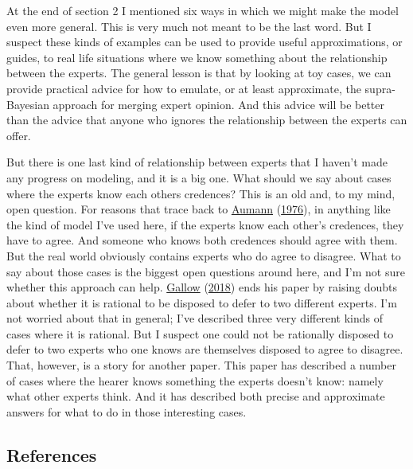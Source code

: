 \documentclass[
  12pt,
]{article}
\begin{document}
At the end of section 2 I mentioned six ways in which we might make the
model even more general. This is very much not meant to be the last
word. But I suspect these kinds of examples can be used to provide
useful approximations, or guides, to real life situations where we know
something about the relationship between the experts. The general lesson
is that by looking at toy cases, we can provide practical advice for how
to emulate, or at least approximate, the supra-Bayesian approach for
merging expert opinion. And this advice will be better than the advice
that anyone who ignores the relationship between the experts can offer.

But there is one last kind of relationship between experts that I
haven't made any progress on modeling, and it is a big one. What should
we say about cases where the experts know each others credences? This is
an old and, to my mind, open question. For reasons that trace back to
\protect\hyperlink{ref-Aumann1976}{Aumann}
(\protect\hyperlink{ref-Aumann1976}{1976}), in anything like the kind of
model I've used here, if the experts know each other's credences, they
have to agree. And someone who knows both credences should agree with
them. But the real world obviously contains experts who do agree to
disagree. What to say about those cases is the biggest open questions
around here, and I'm not sure whether this approach can help.
\protect\hyperlink{ref-Gallow2018}{Gallow}
(\protect\hyperlink{ref-Gallow2018}{2018}) ends his paper by raising
doubts about whether it is rational to be disposed to defer to two
different experts. I'm not worried about that in general; I've described
three very different kinds of cases where it is rational. But I suspect
one could not be rationally disposed to defer to two experts who one
knows are themselves disposed to agree to disagree. That, however, is a
story for another paper. This paper has described a number of cases
where the hearer knows something the experts doesn't know: namely what
other experts think. And it has described both precise and approximate
answers for what to do in those interesting cases.

\hypertarget{references}{%
\subsection*{References}\label{references}}
\end{document}
